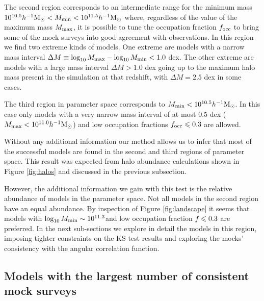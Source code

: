 \documentclass[usenatbib]{mn2e}
\newcommand{\hMsun}{{\ifmmode{h^{-1}{\rm
        {M_{\odot}}}}\else{$h^{-1}{\rm{M_{\odot}}}$}\fi}}
\begin{document}
The second region corresponds to an intermediate range for the minimum
mass $10^{10.5}\hMsun < M_{\rm min}< 10^{11.5}\hMsun$ where,
regardless of the value of the maximum mass $M_{\rm max}$, it is
possible to tune the occupation fraction $f_{\rm occ}$ to bring some
of the mock surveys into good agreement with observations. In this
region we find two extreme kinds of models. One extreme are models
with a narrow mass interval $\Delta M\equiv \log_{10} M_{\rm max}
- \log_{10}M_{\rm  min} <1.0$ dex. The other extreme are models with a
large mass interval $\Delta M>1.0$ dex going up to the maximum halo
mass present in the simulation at that redshift, with $\Delta M = 2.5$
dex in some cases. 
  
The third region in parameter space corresponds to $M_{\rm
  min}<10^{10.5}\hMsun$. In this case only models with a very narrow
mass interval of at most $0.5$ dex ($M_{\rm max}<10^{11.0}\hMsun$) and low
occupation fractions $f_{\rm occ}\leq 0.3$ are allowed. 

Without any additional information our method allows us to infer that
most of the successful models are found in the second and third regions of
parameter space. This result was expected from halo
abundance calculations shown in Figure \ref{fig:halos} and discussed
in the previous subsection. 

However, the additional information we gain with this test is the
relative abundance of models in the parameter space. Not all 
models in the second region have an equal abundance. By inspection of
Figure \ref{fig:landscape} it seems that models with $\log_{10}M_{\rm
  min}\sim 10^{11.3}$\hMsun and low occupation fraction $f_{\rm}\leq 0.3$
are preferred.  In the next sub-sections we explore in detail the
models in this region, imposing tighter constraints on the KS test
results and exploring the mocks' consistency with the angular correlation
function.  

 
\subsection{Models with the largest number of consistent mock surveys}
\end{document}
